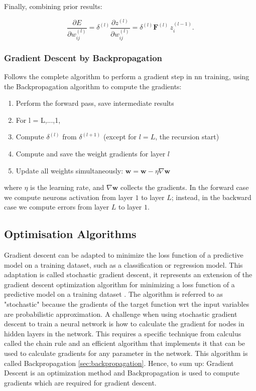 \noindent Finally, combining prior results:
\begin{Equation}[H]
	\centering
	\begin{equation} \label{eq:neurdecomps}
		\frac{\partial E}{\partial w^{(l)}_{ij}} = \delta^{(l)} \frac{\partial z^{(l)}}{\partial w^{(l)}_{ij}} = \delta^{(l)} \bm{F}^{(l)} \, z^{(l-1)}_i .
	\end{equation}
\end{Equation}

\subsubsection{Gradient Descent by Backpropagation}
\label{subsubsec:graddescbyback}
Follows the complete algorithm to perform a gradient step in \gls{nn} training, using the Backpropagation algorithm to compute the gradients:

\begin{enumerate}
  \item Perform the forward pass, save intermediate results
  \item For l = L,...,1,
  \item \quad Compute $\delta^{(l)}$ from $\delta^{(l+1)}$ (except for $l=L$, the recursion start)
  \item \quad Compute and save the weight gradients for layer $l$
  \item Update all weights simultaneously: $\bm{w} = \bm{w} - \eta \nabla \bm{w}$
\end{enumerate}

\noindent where $\eta$ is the learning rate, and $\nabla \bm{w}$ collects the gradients. In the forward case we compute neurons activation from layer $1$ to layer $L$; instead, in the backward case we compute errors from layer $L$ to layer $1$. 

\subsection{Optimisation Algorithms}
\label{nn:optmalgo}
Gradient descent can be adapted to minimize the loss function of a predictive model on a training dataset, such as a classification or regression model. This adaptation is called stochastic gradient descent, it represents an extension of the gradient descent optimization algorithm for minimizing a loss function of a predictive model on a training dataset \cite{Differen84:online}. The algorithm is referred to as "stochastic" because the gradients of the target function \gls{wrt} the input variables are probabilistic approximation. A challenge when using stochastic gradient descent to train a neural network is how to calculate the gradient for nodes in hidden layers in the network. This requires a specific technique from calculus called the chain rule and an efficient algorithm that implements it that can be used to calculate gradients for any parameter in the network. This algorithm is called Backpropagation \ref{sec:backpropagation}. Hence, to sum up: Gradient Descent is an optimization method and Backpropagation is used to compute gradients which are required for gradient descent. \\

